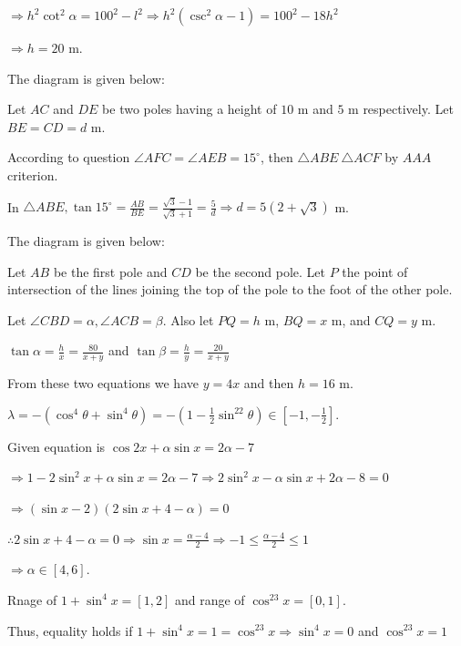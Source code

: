   $\Rightarrow h^2\cot^2\alpha = 100^2 - l^2 \Rightarrow h^2\left(\csc^2\alpha - 1\right) = 100^2 - 18h^2$

  $\Rightarrow h = 20$ m.
\item The diagram is given below:

  \startplacefigure
    \externalfigure[17_9.pdf]
  \stopplacefigure

  Let $AC$ and $DE$ be two poles having a height of $10$ m and $5$ m respectively. Let $BE = CD = d$ m.

  According to question $\angle AFC = \angle AEB = 15^\circ$, then $\triangle ABE ~ \triangle ACF$ by $AAA$
  criterion.

  In $\triangle ABE, \tan15^\circ = \frac{AB}{BE} = \frac{\sqrt{3} - 1}{\sqrt{3} + 1}
  = \frac{5}{d}\Rightarrow d = 5(2 + \sqrt{3})$ m.
\item The diagram is given below:

  \startplacefigure
    \externalfigure[17_10.pdf]
  \stopplacefigure

  Let $AB$ be the first pole and $CD$ be the second pole. Let $P$ the point of intersection of the lines
  joining the top of the pole to the foot of the other pole.

  Let $\angle CBD = \alpha, \angle ACB = \beta$. Also let $PQ = h$ m, $BQ = x$ m, and $CQ = y$ m.

  $\tan\alpha = \frac{h}{x} = \frac{80}{x + y}$ and $\tan\beta = \frac{h}{y} = \frac{20}{x + y}$

  From these two equations we have $y = 4x$ and then $h = 16$ m.
\item $\lambda = -\left(\cos^4\theta + \sin^4\theta\right) = -\left(1
  - \frac{1}{2}\sin^22\theta\right)\in\left[-1, -\frac{1}{2}\right]$.
\item Given equation is $\cos2x + \alpha\sin x = 2\alpha - 7$

  $\Rightarrow 1 - 2\sin^2x + \alpha\sin x = 2\alpha - 7 \Rightarrow 2\sin^2x - \alpha\sin x + 2\alpha - 8
  = 0$

  $\Rightarrow (\sin x - 2)(2\sin x + 4 -\alpha) = 0$

  $\therefore 2\sin x + 4 - \alpha = 0\Rightarrow \sin x = \frac{\alpha - 4}{2}\Rightarrow
  -1\leq \frac{\alpha - 4}{2}\leq 1$

  $\Rightarrow \alpha\in[4, 6]$.
\item Rnage of $1 + \sin^4x = [1, 2]$ and range of $\cos^23x = [0, 1]$.

  Thus, equality holds if $1 + \sin^4x = 1 = \cos^23x\Rightarrow \sin^4x = 0$ and $\cos^23x = 1$

